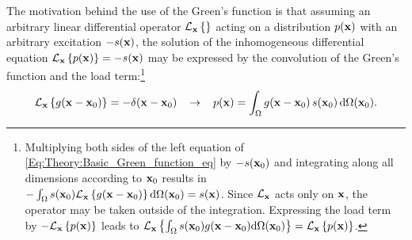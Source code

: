 The motivation behind the use of the Green's function is that assuming an arbitrary linear differential operator $\mathcal{L}_{\mathbf{x}}\left\{ \right\}$ acting on a distribution $p(\mathbf{x})$ with an arbitrary excitation $-s(\mathbf{x})$, the solution of the inhomogeneous differential equation $\mathcal{L}_{\mathbf{x}} \left\{ p(\mathbf{x}) \right\} = -s(\mathbf{x})$ may be expressed by the convolution of the Green's function and the load term:\footnote{Multiplying both sides of the left equation of \eqref{Eq:Theory:Basic_Green_function_eq} by $-s(\mathbf{x}_0)$ and integrating along all dimensions according to $\mathbf{x}_0$ results in
$-\int_{\Omega} s(\mathbf{x}_0)\mathcal{L}_{\mathbf{x}}\left\{ g(\mathbf{x}-\mathbf{x}_0) \right\} \mathrm{d} \Omega(\mathbf{x}_0) = s(\mathbf{x})$.
Since $\mathcal{L}_{\mathbf{x}}$ acts only on $\mathbf{x}$, the operator may be taken outside of the integration.
Expressing the load term by $-\mathcal{L}_{\mathbf{x}}\left\{ p(\mathbf{x}) \right\}$ leads to $\mathcal{L}_{\mathbf{x}}\left\{ \int_{\Omega} s(\mathbf{x}_0) g(\mathbf{x}-\mathbf{x}_0) \mathrm{d} \Omega(\mathbf{x}_0) \right\} = \mathcal{L}_{\mathbf{x}}\left\{ p(\mathbf{x}) \right\}$.
}
\begin{equation}
\mathcal{L}_{\mathbf{x}}\left\{ g(\mathbf{x}-\mathbf{x}_0) \right\} = -\delta( \mathbf{x}-\mathbf{x}_0 ) \hspace{3mm} \rightarrow \hspace{3mm}
p(\mathbf{x}) = \int_{\Omega}  g(\mathbf{x}-\mathbf{x}_0) \, s(\mathbf{x}_0) \, \mathrm{d} \Omega (\mathbf{x}_0).
\label{Eq:Theory:Basic_Green_function_eq}
\end{equation}

